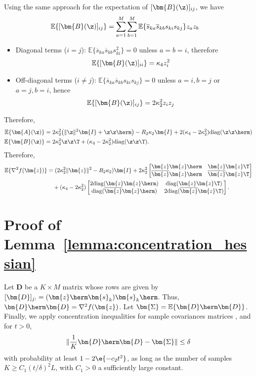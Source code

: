 Using the same approach for the expectation of $[\bm{B}(\z)]_{ij}$, we have
\begin{align}
\mathbb{E}\{[\bm{B}(\z)]_{ij}\}&=\sum_{a=1}^M\sum_{b=1}^M\mathbb{E}\{\overline{s}_{ka}\overline{s}_{kb}s_{ki}{s}_{kj}\}z_a{z}_b
\end{align}
\begin{itemize}
	\item Diagonal terms ($i=j$): $\mathbb{E}\{\overline{s}_{ka}\overline{s}_{kb}s_{ki}^2\}=0$ unless $a=b=i$, therefore
	\begin{align}
	\mathbb{E}\{[\bm{B}(\z)]_{ii}\}&=\kappa_4z_i^2
	\end{align}
	\item Off-diagonal terms ($i\neq j$): $\mathbb{E}\{\overline{s}_{ka}\overline{s}_{kb}s_{ki}s_{kj}\}=0$ unless $a=i,b=j$ or $a=j,b=i$, hence
	\begin{align}
	\mathbb{E}\{[\bm{B}(\z)]_{ij}\}&=2\kappa_2^2z_iz_j
	\end{align}
\end{itemize}
Therefore,
\begin{align}
\mathbb{E}\{\bm{A}(\z)\}&=2\kappa_2^2\big(\|\z\|^2\bm{I}+\z\z\herm\big)-R_2\kappa_2\bm{I}+2(\kappa_4-2\kappa_2^2)\mathrm{diag}(\z\z\herm)\\
\mathbb{E}\{\bm{B}(\z)\}&=2\kappa_2^2\z\z\T+(\kappa_4-2\kappa_2^2)\mathrm{diag}(\z\z\T).
\end{align}
Therefore,
\begin{align}
\mathbb{E}\{\nabla^2 f(\bm{z})\}&=  (2\kappa_2^2\|\bm{z}\|^2-R_2\kappa_2)\bm{I}+ 2\kappa_2^2\begin{bmatrix}
\bm{z}\bm{z}\herm&\bm{z}\bm{z}\T\\
\overline{\bm{z}}\bm{z}\herm&\overline{\bm{z}}\bm{z}\T
\end{bmatrix}\nonumber\\
&\quad+(\kappa_4-2\kappa_2^2)\begin{bmatrix}
2\mathrm{diag}(\bm{z}\bm{z}\herm)&\mathrm{diag}(\bm{z}\bm{z}\T)\\
\mathrm{diag}(\overline{\bm{z}}\bm{z}\herm)&2\mathrm{diag}(\overline{\bm{z}}\bm{z}\T)
\end{bmatrix}.
\end{align}

\section{Proof of Lemma~\ref{lemma:concentration_hessian}}\label{appdx:concentration_hessian}
Let $\bm{D}$ be a $K\times M$ matrix whose rows are given by $[\bm{D}]_{j:}=(\bm{z}\herm\bm{s}_k)\bm{s}_k\herm$. Thus, $\bm{D}\herm\bm{D}=\nabla^2 f(\bm{z})$. Let $\bm{\Sigma}=\mathbb{E}\{\bm{D}\herm\bm{D}\}$. Finally, we apply concentration inequalities for sample covariances matrices \cite[Theorem 5.39]{Vershynin2012nonasymptoticmatrices}, and for $t>0$, 
\begin{equation}
\|\frac{1}{K}\bm{D}\herm\bm{D}-\bm{\Sigma}\|\leq \delta
\end{equation}
with probability at least $1-2\e{-c_2t^2}$, as long as the number of samples $K \geq C_1(t/\delta)^2L$, with $C_1>0$ a sufficiently large constant. 

